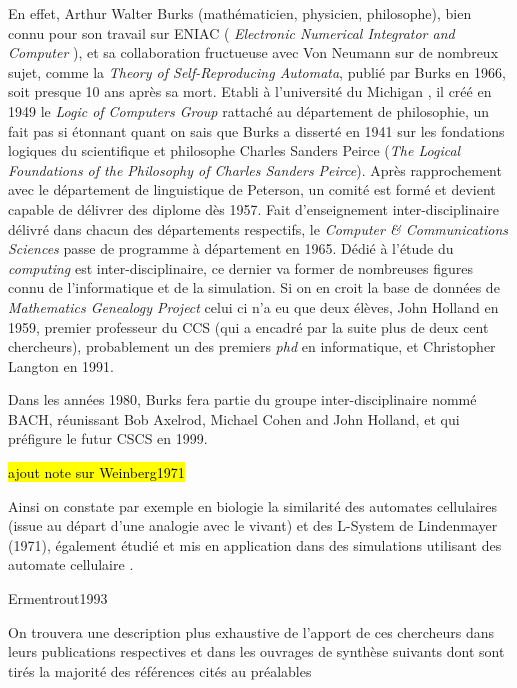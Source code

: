 En effet, Arthur Walter Burks (mathématicien, physicien, philosophe), bien connu pour son travail sur ENIAC ( \textit{Electronic Numerical Integrator and Computer} ), et sa collaboration fructueuse avec Von Neumann sur de nombreux sujet, comme la \textit{Theory of Self-Reproducing Automata}, publié par Burks en 1966, soit presque 10 ans après sa mort. Etabli à l'université du Michigan , il créé en 1949 le \textit{Logic of Computers Group} rattaché au département de philosophie, un fait pas si étonnant quant on sais que Burks a disserté en 1941 sur les fondations logiques du scientifique et philosophe Charles Sanders Peirce (\textit{The Logical Foundations of the Philosophy of Charles Sanders Peirce}). Après rapprochement avec le département de linguistique de Peterson, un comité est formé et devient capable de délivrer des diplome dès 1957. Fait d'enseignement inter-disciplinaire délivré dans chacun des départements respectifs, le \textit{Computer \& Communications Sciences} passe de programme à département en 1965. Dédié à l'étude du \textit{computing} est inter-disciplinaire, ce dernier va former de nombreuses figures connu de l'informatique et de la simulation. Si on en croit la base de données de \textit{Mathematics Genealogy Project} celui ci n'a eu que deux élèves, John Holland en 1959, premier professeur du CCS (qui a encadré par la suite plus de deux cent chercheurs), probablement un des premiers \textit{phd} en informatique, et Christopher Langton en 1991.


Dans les années 1980, Burks fera partie du groupe inter-disciplinaire nommé BACH, réunissant Bob Axelrod, Michael Cohen and John Holland, et qui préfigure le futur CSCS en 1999.

\hl{ ajout note sur Weinberg1971 }

Ainsi on constate par exemple en biologie la similarité \autocite{Hermann1973, Hogeweg1974, Stauffer1998} des automates cellulaires (issue au départ d'une analogie avec le vivant) et des L-System \autocite{Prusinkiewicz1999} de Lindenmayer (1971), également étudié et mis en application dans des simulations utilisant des automate cellulaire \autocites{Hogeweg1978, Frijters1974}.

Ermentrout1993

On trouvera une description plus exhaustive de l'apport de ces chercheurs dans leurs publications respectives et dans les ouvrages de synthèse suivants dont sont tirés la majorité des références cités au préalables \autocites{Dyson1997,Fogel1998, Sipper1998, Fogel2006a}[46-66]{Taylor1999} 

